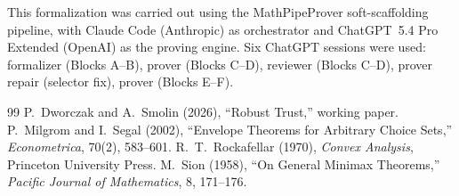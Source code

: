 \documentclass[12pt]{article}
\begin{document}
This formalization was carried out using the MathPipeProver soft-scaffolding pipeline, with Claude Code (Anthropic) as orchestrator and ChatGPT~5.4 Pro Extended (OpenAI) as the proving engine. Six ChatGPT sessions were used: formalizer (Blocks A--B), prover (Blocks C--D), reviewer (Blocks C--D), prover repair (selector fix), prover (Blocks E--F).

\begin{thebibliography}{99}
 P.~Dworczak and A.~Smolin (2026), ``Robust Trust,'' working paper.
 P.~Milgrom and I.~Segal (2002), ``Envelope Theorems for Arbitrary Choice Sets,'' \textit{Econometrica}, 70(2), 583--601.
 R.~T.~Rockafellar (1970), \textit{Convex Analysis}, Princeton University Press.
 M.~Sion (1958), ``On General Minimax Theorems,'' \textit{Pacific Journal of Mathematics}, 8, 171--176.
\end{thebibliography}
\end{document}

